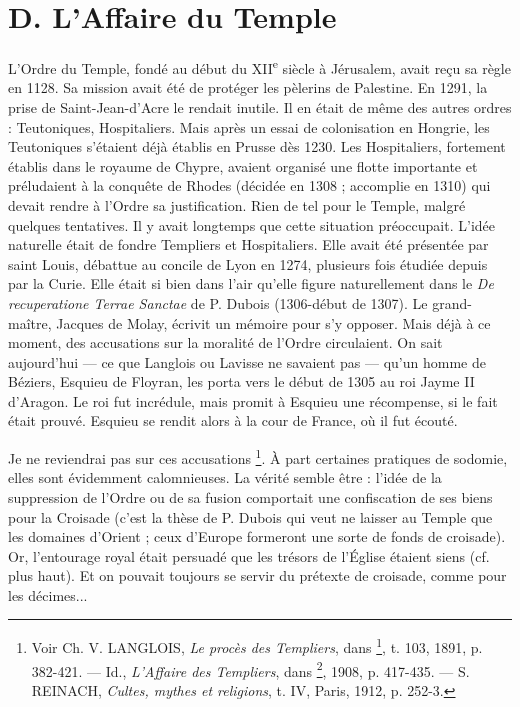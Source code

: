 \documentclass[french,twoside]{book} %
\begin{document}
\section[D. L’Affaire du Temple]{D. L’Affaire du Temple \protect\footnotemark}
\label{c06d}
\noindent L’Ordre du Temple, fondé au début du XII\textsuperscript{e} siècle à Jérusalem, avait reçu sa règle en 1128. Sa mission avait été de protéger les pèlerins de Palestine. En 1291, la prise de Saint-Jean-d’Acre le rendait inutile. Il en était de même des autres ordres : Teutoniques, Hospitaliers. Mais après un essai de colonisation en Hongrie, les Teutoniques s’étaient déjà établis en Prusse dès 1230. Les Hospitaliers, fortement établis dans le royaume de Chypre, avaient organisé une flotte importante et préludaient à la conquête de Rhodes (décidée en 1308 ; accomplie en 1310) qui devait rendre à l’Ordre sa justification. Rien de tel pour le Temple, malgré quelques tentatives. Il y avait longtemps que cette situation préoccupait. L’idée naturelle était de fondre Templiers et Hospitaliers. Elle avait été présentée par saint Louis, débattue au concile de Lyon en 1274, plusieurs fois étudiée depuis par la Curie. Elle était si bien dans l’air qu’elle figure naturellement dans le {\itshape De recuperatione Terrae Sanctae} de P. Dubois (1306-début de 1307). Le grand-maître, Jacques de Molay, écrivit un mémoire pour s’y opposer. Mais déjà à ce moment, des accusations sur la moralité de l’Ordre circulaient. On sait aujourd’hui — ce que Langlois ou Lavisse ne savaient pas — qu’un homme de Béziers, Esquieu de Floyran, les porta vers le début de 1305 au roi Jayme II d’Aragon. Le roi fut incrédule, mais promit à Esquieu une récompense, si le fait était prouvé. Esquieu se rendit alors à la cour de France, où il fut écouté.\par
Je ne reviendrai pas sur ces accusations \footnote{ Voir Ch. V. LANGLOIS, {\itshape Le procès des Templiers}, dans \href{http://gallica.bnf.fr/document?O=N087160}{}\footnote{\href{http://gallica.bnf.fr/document?O=N087160}{\url{http://gallica.bnf.fr/document?O=N087160}}}, t. 103, 1891, p. 382-421. — Id., {\itshape L’Affaire des Templiers}, dans \href{http://gallica.bnf.fr/document?O=N054717}{}\footnote{\href{http://gallica.bnf.fr/document?O=N054717}{\url{http://gallica.bnf.fr/document?O=N054717}}}, 1908, p. 417-435. — S. REINACH, {\itshape Cultes, mythes et religions}, t. IV, Paris, 1912, p. 252-3.}. À part certaines pratiques de sodomie, elles sont évidemment calomnieuses. La vérité semble être : l’idée de la suppression de l’Ordre ou de sa fusion comportait une confiscation de ses biens pour la Croisade (c’est la thèse de P. Dubois qui veut ne laisser au Temple que les domaines d’Orient ; ceux d’Europe formeront une sorte de fonds de croisade). Or, l’entourage royal était persuadé que les trésors de l’Église étaient siens (cf. plus haut). Et on pouvait toujours se servir du prétexte de croisade, comme pour les décimes...\par
\end{document}
